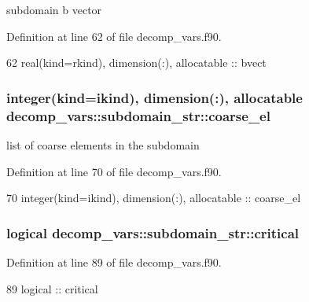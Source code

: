 subdomain b vector 



Definition at line 62 of file decomp\+\_\+vars.\+f90.


\begin{DoxyCode}
62     \textcolor{keywordtype}{real(kind=rkind)}, \textcolor{keywordtype}{dimension(:)}, \textcolor{keywordtype}{allocatable} :: bvect
\end{DoxyCode}
\subsubsection[{coarse\+\_\+el}]{\setlength{\rightskip}{0pt plus 5cm}integer(kind=ikind), dimension(\+:), allocatable decomp\+\_\+vars\+::subdomain\+\_\+str\+::coarse\+\_\+el}\label{structdecomp__vars_1_1subdomain__str_a50f6c9faae2c08c34bc654dbba535a6a}


list of coarse elements in the subdomain 



Definition at line 70 of file decomp\+\_\+vars.\+f90.


\begin{DoxyCode}
70     \textcolor{keywordtype}{integer(kind=ikind)}, \textcolor{keywordtype}{dimension(:)}, \textcolor{keywordtype}{allocatable} :: coarse\_el
\end{DoxyCode}
\subsubsection[{critical}]{\setlength{\rightskip}{0pt plus 5cm}logical decomp\+\_\+vars\+::subdomain\+\_\+str\+::critical}\label{structdecomp__vars_1_1subdomain__str_a35600abdf23cf2684ba786c737330c1c}


Definition at line 89 of file decomp\+\_\+vars.\+f90.


\begin{DoxyCode}
89     \textcolor{keywordtype}{logical} :: critical
\end{DoxyCode}
